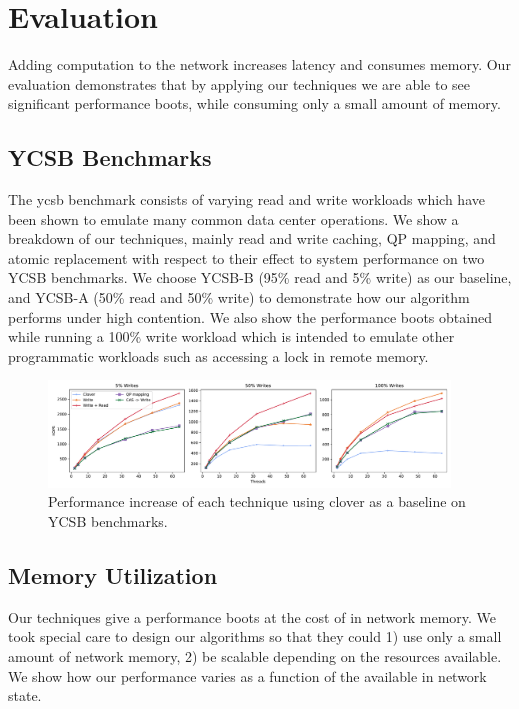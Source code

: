 \section{Evaluation}

Adding computation to the network increases latency and consumes memory. Our
evaluation demonstrates that by applying our techniques we are able to see
significant performance boots, while consuming only a small amount of memory.

\subsection{YCSB Benchmarks}

The ycsb benchmark consists of varying read and write workloads which have been
shown to emulate many common data center operations. We show a breakdown of our
techniques, mainly read and write caching, QP mapping, and atomic replacement
with respect to their effect to system performance on two YCSB benchmarks. We
choose YCSB-B (95\% read and 5\% write) as our baseline, and YCSB-A (50\% read and
50\% write) to demonstrate how our algorithm performs under high contention. We
also show the performance boots obtained while running a 100\% write workload
which is intended to emulate other programmatic workloads such as accessing a
lock in remote memory.

\begin{figure}
    \includegraphics[width=0.95\textwidth]{fig/full_system_performance.pdf}
    \caption{{Performance increase of each technique using clover as a baseline on YCSB benchmarks.}}
    \label{fig:full_system_performance}
\end{figure}


\subsection{Memory Utilization}

Our techniques give a performance boots at the cost of in network memory. We
took special care to design our algorithms so that they could 1) use only a
small amount of network memory, 2) be scalable depending on the resources
available. We show how our performance varies as a function of the available in
network state.

